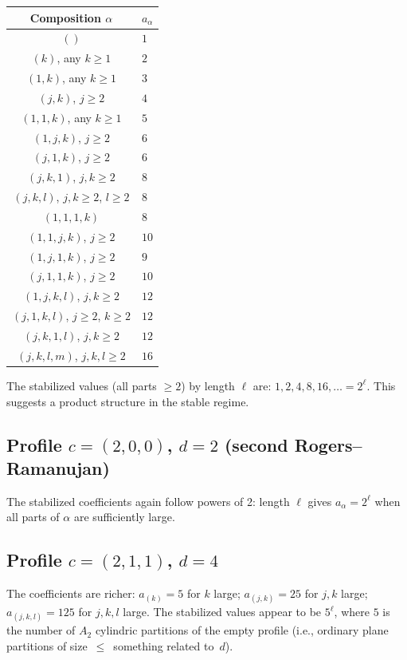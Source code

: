 \documentclass[11pt]{article}
\begin{document}
\begin{center}
\begin{tabular}{c|l}
  \textbf{Composition $\alpha$} & \textbf{$a_\alpha$} \\
  \hline
  $()$ & $1$ \\
  $(k)$, any $k \geq 1$ & $2$ \\
  $(1, k)$, any $k \geq 1$ & $3$ \\
  $(j, k)$, $j \geq 2$ & $4$ \\
  $(1, 1, k)$, any $k \geq 1$ & $5$ \\
  $(1, j, k)$, $j \geq 2$ & $6$ \\
  $(j, 1, k)$, $j \geq 2$ & $6$ \\
  $(j, k, 1)$, $j,k \geq 2$ & $8$ \\
  $(j, k, l)$, $j,k \geq 2$, $l \geq 2$ & $8$ \\
  $(1, 1, 1, k)$ & $8$ \\
  $(1, 1, j, k)$, $j \geq 2$ & $10$ \\
  $(1, j, 1, k)$, $j \geq 2$ & $9$ \\
  $(j, 1, 1, k)$, $j \geq 2$ & $10$ \\
  $(1, j, k, l)$, $j,k \geq 2$ & $12$ \\
  $(j, 1, k, l)$, $j \geq 2$, $k \geq 2$ & $12$ \\
  $(j, k, 1, l)$, $j,k \geq 2$ & $12$ \\
  $(j, k, l, m)$, $j,k,l \geq 2$ & $16$
\end{tabular}
\end{center}

The stabilized values (all parts $\geq 2$) by length $\ell$ are:
$1, 2, 4, 8, 16, \ldots = 2^\ell$. This suggests a product
structure in the stable regime.

\subsection{Profile $c = (2,0,0)$, $d = 2$ (second Rogers--Ramanujan)}

The stabilized coefficients again follow powers of 2:
length $\ell$ gives $a_\alpha = 2^\ell$ when all parts of $\alpha$
are sufficiently large.

\subsection{Profile $c = (2,1,1)$, $d = 4$}

The coefficients are richer: $a_{(k)} = 5$ for $k$ large;
$a_{(j,k)} = 25$ for $j,k$ large;
$a_{(j,k,l)} = 125$ for $j,k,l$ large.
The stabilized values appear to be $5^\ell$, where $5$ is the
number of $A_2$ cylindric partitions of the empty profile (i.e.,
ordinary plane partitions of size~$\leq$~something related to~$d$).
\end{document}
